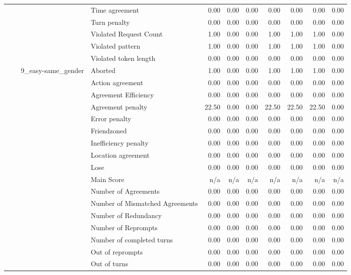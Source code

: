 \begin{tabular}{llllrrrrrrr}
 &  &  & Time agreement & 0.00 & 0.00 & 0.00 & 0.00 & 0.00 & 0.00 & 0.00 \\
 &  &  & Turn penalty & 0.00 & 0.00 & 0.00 & 0.00 & 0.00 & 0.00 & 0.00 \\
 &  &  & Violated Request Count & 1.00 & 0.00 & 0.00 & 1.00 & 1.00 & 1.00 & 0.00 \\
 &  &  & Violated pattern & 1.00 & 0.00 & 0.00 & 1.00 & 1.00 & 1.00 & 0.00 \\
 &  &  & Violated token length & 0.00 & 0.00 & 0.00 & 0.00 & 0.00 & 0.00 & 0.00 \\
\cline{3-11}
 &  & \multirow[t]{27}{*}{9_easy-same_gender} & Aborted & 1.00 & 0.00 & 0.00 & 1.00 & 1.00 & 1.00 & 0.00 \\
 &  &  & Action agreement & 0.00 & 0.00 & 0.00 & 0.00 & 0.00 & 0.00 & 0.00 \\
 &  &  & Agreement Efficiency & 0.00 & 0.00 & 0.00 & 0.00 & 0.00 & 0.00 & 0.00 \\
 &  &  & Agreement penalty & 22.50 & 0.00 & 0.00 & 22.50 & 22.50 & 22.50 & 0.00 \\
 &  &  & Error penalty & 0.00 & 0.00 & 0.00 & 0.00 & 0.00 & 0.00 & 0.00 \\
 &  &  & Friendzoned & 0.00 & 0.00 & 0.00 & 0.00 & 0.00 & 0.00 & 0.00 \\
 &  &  & Inefficiency penalty & 0.00 & 0.00 & 0.00 & 0.00 & 0.00 & 0.00 & 0.00 \\
 &  &  & Location agreement & 0.00 & 0.00 & 0.00 & 0.00 & 0.00 & 0.00 & 0.00 \\
 &  &  & Lose & 0.00 & 0.00 & 0.00 & 0.00 & 0.00 & 0.00 & 0.00 \\
 &  &  & Main Score & n/a & n/a & n/a & n/a & n/a & n/a & n/a \\
 &  &  & Number of Agreements & 0.00 & 0.00 & 0.00 & 0.00 & 0.00 & 0.00 & 0.00 \\
 &  &  & Number of Mismatched Agreements & 0.00 & 0.00 & 0.00 & 0.00 & 0.00 & 0.00 & 0.00 \\
 &  &  & Number of Redundancy & 0.00 & 0.00 & 0.00 & 0.00 & 0.00 & 0.00 & 0.00 \\
 &  &  & Number of Reprompts & 0.00 & 0.00 & 0.00 & 0.00 & 0.00 & 0.00 & 0.00 \\
 &  &  & Number of completed turns & 0.00 & 0.00 & 0.00 & 0.00 & 0.00 & 0.00 & 0.00 \\
 &  &  & Out of reprompts & 0.00 & 0.00 & 0.00 & 0.00 & 0.00 & 0.00 & 0.00 \\
 &  &  & Out of turns & 0.00 & 0.00 & 0.00 & 0.00 & 0.00 & 0.00 & 0.00 \\

\end{tabular}
